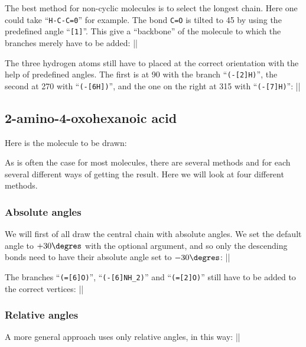 \documentclass[10pt]{article}
\begin{document}
The best method for non-cyclic molecules is to select the longest chain. Here one could take ``\verb|H-C-C=0|'' for example. The bond \verb|C=O| is tilted to 45\degres{} by using the predefined angle ``\verb-[1]-''. This give a ``backbone'' of the molecule to which the branches merely have to be added:
||

The three hydrogen atoms still have to placed at the correct orientation with the help of predefined angles. The first is at 90\degres{} with the branch ``\verb/(-[2]H)/'', the second at 270\degres{} with ``\verb/(-[6H])/'', and the one on the right at 315\degres{} with ``\verb/(-[7]H)/'':
||

\subsection{2-amino-4-oxohexanoic acid}
Here is the molecule to be drawn: 

As is often the case for most molecules, there are several methods and for each several different ways of getting the result. Here we will look at four different methods.

\subsubsection{Absolute angles}
We will first of all draw the central chain with absolute angles. We set the default angle to $+30\degres$ with the optional argument, and so only the descending bonds need to have their absolute angle set to $-30\degres$:
||

The branches ``\verb/(=[6]O)/'', ``\verb/(-[6]NH_2)/'' and ``\verb/(=[2]O)/'' still have to be added to the correct vertices:
||

\subsubsection{Relative angles}
A more general approach uses only relative angles, in this way:
||
\end{document}
